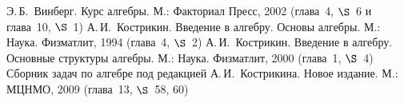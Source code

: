 \documentclass[a4paper,10pt]{amsart}
\theoremstyle{definition}
\theoremstyle{remark}
\begin{document}
\bigskip

\begin{thebibliography}{99}
Э.\,Б.~Винберг. Курс алгебры. М.: Факториал Пресс, 2002 (глава~4,
$\S$~6 и глава~10, $\S$~1)
А.\,И.~Кострикин. Введение в алгебру. Основы алгебры. М.: Наука.
Физматлит, 1994 (глава~4, $\S$~2)
А.\,И.~Кострикин. Введение в алгебру. Основные структуры алгебры.
М.: Наука. Физматлит, 2000 (глава~1, $\S$~4)
Сборник задач по алгебре под редакцией А.\,И.~Кострикина. Новое
издание. М.: МЦНМО, 2009 (глава~13, $\S$~58, 60)
\end{thebibliography}
\end{document}
